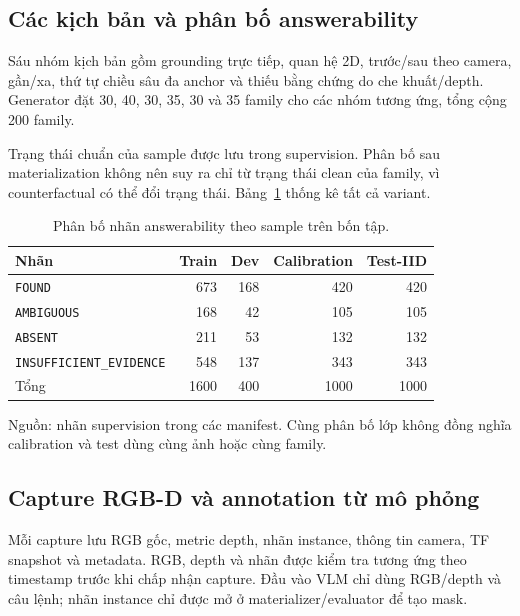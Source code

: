 \subsection{Các kịch bản và phân bố answerability}

Sáu nhóm kịch bản gồm grounding trực tiếp, quan hệ 2D, trước/sau
theo camera, gần/xa, thứ tự chiều sâu đa anchor và thiếu bằng
chứng do che khuất/depth. Generator đặt 30, 40, 30, 35, 30 và
35 family cho các nhóm tương ứng, tổng cộng 200 family.

Trạng thái chuẩn của sample được lưu trong supervision.
Phân bố sau materialization không nên suy ra chỉ từ trạng thái
clean của family, vì counterfactual có thể đổi trạng thái.
Bảng~\ref{tab:setup-answer-distribution} thống kê tất cả variant.

\begin{table}[htbp]
    \centering
    \setlength{\tabcolsep}{4pt}
    \renewcommand{\arraystretch}{1.15}
    \caption{Phân bố nhãn answerability theo sample trên bốn tập.}
    \label{tab:setup-answer-distribution}
    \small
    \begin{tabularx}{\textwidth}{@{}>{\raggedright\arraybackslash}Xrrrr@{}}
        \toprule
        Nhãn & Train & Dev & Calibration & Test-IID \\
        \midrule
        \texttt{FOUND} & 673 & 168 & 420 & 420 \\
        \texttt{AMBIGUOUS} & 168 & 42 & 105 & 105 \\
        \texttt{ABSENT} & 211 & 53 & 132 & 132 \\
        \texttt{INSUFFICIENT\_\allowbreak EVIDENCE} & 548 & 137 & 343 & 343 \\
        \midrule
        Tổng & 1600 & 400 & 1000 & 1000 \\
        \bottomrule
    \end{tabularx}
    \vspace{2pt}
    {\footnotesize\raggedright Nguồn: nhãn supervision trong các manifest.
    Cùng phân bố lớp không đồng nghĩa calibration và test dùng
    cùng ảnh hoặc cùng family.\par}
\end{table}

\subsection{Capture RGB-D và annotation từ mô phỏng}

Mỗi capture lưu RGB gốc, metric depth, nhãn instance, thông tin
camera, TF snapshot và metadata. RGB, depth và nhãn được kiểm
tra tương ứng theo timestamp trước khi chấp nhận capture.
Đầu vào VLM chỉ dùng RGB/depth và câu lệnh; nhãn instance chỉ
được mở ở materializer/evaluator để tạo mask.

